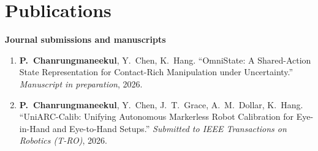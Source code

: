 \documentclass[10pt,letterpaper]{article}
\newcommand{\me}{\textbf{P.~Chanrungmaneekul}}
\newcommand{\venue}[1]{\textit{#1}}
\begin{document}
\section{Publications}
{\small
\textbf{Journal submissions and manuscripts}\par\nopagebreak
\begin{enumerate}
  \item \me, Y.~Chen, K.~Hang. ``OmniState: A Shared-Action State Representation for Contact-Rich Manipulation under Uncertainty.''
    \venue{Manuscript in preparation}, 2026.
  \item \me, Y.~Chen, J.~T.~Grace, A.~M.~Dollar, K.~Hang. ``UniARC-Calib: Unifying Autonomous Markerless Robot
    Calibration for Eye-in-Hand and Eye-to-Hand Setups.'' \venue{Submitted to IEEE Transactions on Robotics (T-RO)}, 2026.
\end{enumerate}

}
\end{document}
